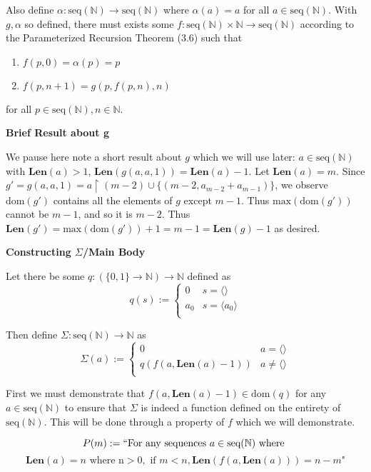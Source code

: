 \documentclass{article}
\newcommand{ \len }[0]{ \textbf{Len} }
\newcommand{ \seqnat }[0]{ \text{seq}(\mathbb{N}) }
\newcommand{ \Max }[0]{\text{max}}
\newcommand{ \dom }[0]{\text{dom}}
\newcommand{ \nat }[0]{\mathbb{N}}
\begin{document}
\begin{enumerate}
		Also define $\alpha: \seqnat \xrightarrow{} \seqnat$ where $\alpha(a) = a$ for all $a \in \seqnat$. With $g,\alpha$ so defined, there must exists some $f: \seqnat \times \mathbb{N} \xrightarrow{} \seqnat $ according to the Parameterized Recursion Theorem (3.6) such that 
		
		\begin{enumerate}
		\item $f(p, 0) = \alpha(p) = p$
		\item $f(p, n + 1) = g(p, f(p, n), n)$
		 \end{enumerate}
		  for all $p \in \seqnat, n \in \mathbb{N}$. 
		  
		  \medskip
		  \textbf{Brief Result about g}
		  \medskip
		  
		  We pause here note a short result about $g$ which we will use later: $a \in \seqnat$ with $\len(a) > 1$, $\len(g(a, a, 1)) = \len(a) - 1$. Let $\len(a) = m$. Since $g' = g(a, a, 1) = a \upharpoonright (m - 2) \cup \{(m - 2, a_{m - 2} + a_{m - 1})\}$, we observe $\dom(g')$ contains all the elements of $g$ except $m - 1$. Thus $\Max(\dom(g'))$ cannot be $m - 1$, and so it is $m - 2$. Thus $\len(g') = \Max(\dom(g')) + 1 = m - 1 = \len(g) - 1$ as desired.
		  
		  \newpage
		  \textbf{Constructing $\Sigma$/Main Body}
		  \medskip
		  
		  Let there be some $q: (\{0,1\} \xrightarrow{} \mathbb{N}) \xrightarrow{} \mathbb{N}$ defined as 
		  $$q(s) := \begin{cases}
		  	0 & s = \langle \rangle\\
			a_0 & s = \langle a_0 \rangle\\
		  \end{cases}$$
		  
		  Then define $\Sigma: \seqnat \xrightarrow{} \nat$ as $$\Sigma(a) :=
		  	\begin{cases}
			0 & a = \langle \rangle\\
		   	q(f(a, \len(a) - 1)) & a \neq \langle \rangle\\
			\end{cases}$$
		  
		  First we must demonstrate that $f(a, \len(a) - 1) \in \text{dom}(q)$ for any $a \in \seqnat$ to ensure that $\Sigma$ is indeed a function defined on the entirety of $\seqnat$. This will be done through a property of $f$ which we will demonstrate. 
		  
		  $$P(m) := ``\text{For any sequences } a \in \seqnat \text{ where }$$
		  $$\len(a) = n \text{ where n} > 0, \text{ if } m < n, \len(f(a, \len(a))) = n - m\text{"}$$
		  

\end{enumerate}
\end{document}
